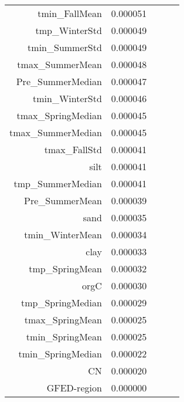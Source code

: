 \begin{tabular}{rrrrr}
tmin_FallMean & 0.000051 \\
tmp_WinterStd & 0.000049 \\
tmin_SummerStd & 0.000049 \\
tmax_SummerMean & 0.000048 \\
Pre_SummerMedian & 0.000047 \\
tmin_WinterStd & 0.000046 \\
tmax_SpringMedian & 0.000045 \\
tmax_SummerMedian & 0.000045 \\
tmax_FallStd & 0.000041 \\
silt & 0.000041 \\
tmp_SummerMedian & 0.000041 \\
Pre_SummerMean & 0.000039 \\
sand & 0.000035 \\
tmin_WinterMean & 0.000034 \\
clay & 0.000033 \\
tmp_SpringMean & 0.000032 \\
orgC & 0.000030 \\
tmp_SpringMedian & 0.000029 \\
tmax_SpringMean & 0.000025 \\
tmin_SpringMean & 0.000025 \\
tmin_SpringMedian & 0.000022 \\
CN & 0.000020 \\
GFED-region & 0.000000 \\
\bottomrule
\end{tabular}
